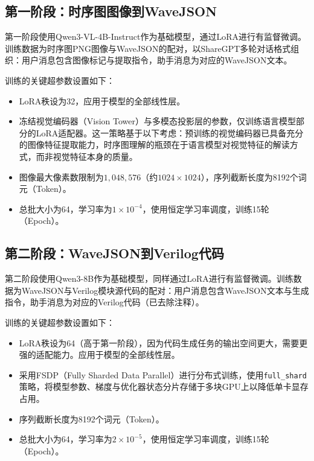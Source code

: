 \subsection{第一阶段：时序图图像到WaveJSON}

第一阶段使用Qwen3-VL-4B-Instruct作为基础模型，通过LoRA进行有监督微调。训练数据为时序图PNG图像与WaveJSON的配对，以ShareGPT多轮对话格式组织：用户消息包含图像标记与提取指令，助手消息为对应的WaveJSON文本。

训练的关键超参数设置如下：
\begin{itemize}
  \item LoRA秩设为32，应用于模型的全部线性层。
  \item 冻结视觉编码器（Vision Tower）与多模态投影层的参数，仅训练语言模型部分的LoRA适配器。这一策略基于以下考虑：预训练的视觉编码器已具备充分的图像特征提取能力，时序图理解的瓶颈在于语言模型对视觉特征的解读方式，而非视觉特征本身的质量。
  \item 图像最大像素数限制为$1{,}048{,}576$（约$1024 \times 1024$），序列截断长度为8192个词元（Token）。
  \item 总批大小为64，学习率为$1 \times 10^{-4}$，使用恒定学习率调度，训练15轮（Epoch）。
\end{itemize}


\subsection{第二阶段：WaveJSON到Verilog代码}

第二阶段使用Qwen3-8B作为基础模型，同样通过LoRA进行有监督微调。训练数据为WaveJSON与Verilog模块源代码的配对：用户消息包含WaveJSON文本与生成指令，助手消息为对应的Verilog代码（已去除注释）。

训练的关键超参数设置如下：
\begin{itemize}
  \item LoRA秩设为64（高于第一阶段），因为代码生成任务的输出空间更大，需要更强的适配能力。应用于模型的全部线性层。
  \item 采用FSDP（Fully Sharded Data Parallel）进行分布式训练，使用\texttt{full\_shard}策略，将模型参数、梯度与优化器状态分片存储于多块GPU上以降低单卡显存占用。
  \item 序列截断长度为8192个词元（Token）。
  \item 总批大小为64，学习率为$2 \times 10^{-5}$，使用恒定学习率调度，训练15轮（Epoch）。
\end{itemize}


